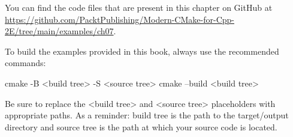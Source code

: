 

You can find the code files that are present in this chapter on GitHub at \url{https://github.com/PacktPublishing/Modern-CMake-for-Cpp-2E/tree/main/examples/ch07}.

To build the examples provided in this book, always use the recommended commands:

\begin{shell}
cmake -B <build tree> -S <source tree>
cmake --build <build tree>
\end{shell}

Be sure to replace the <build tree> and <source tree> placeholders with appropriate paths. As a reminder: build tree is the path to the target/output directory and source tree is the path at which your source code is located.














